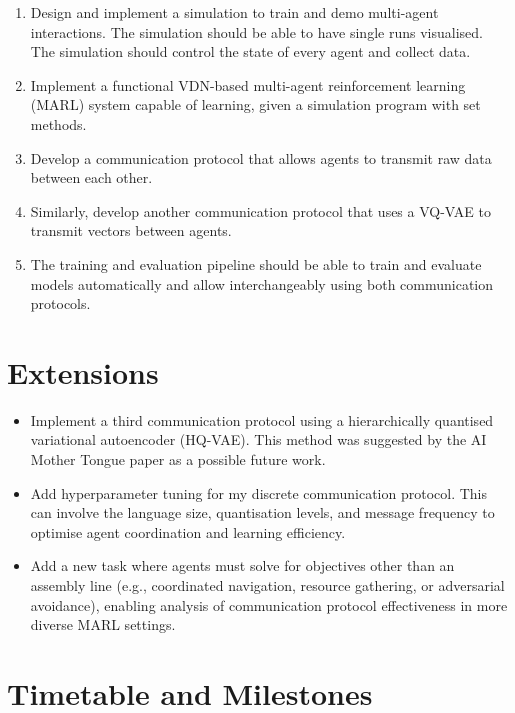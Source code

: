 \begin{enumerate}
\item Design and implement a simulation to train and demo multi-agent interactions. The simulation should be able to have single runs visualised. The simulation should control the state of every agent and collect data.
\item Implement a functional VDN-based multi-agent reinforcement learning (MARL) system capable of learning, given a simulation program with set methods.
\item Develop a communication protocol that allows agents to transmit raw data between each other.
\item Similarly, develop another communication protocol that uses a VQ-VAE  to transmit vectors between agents.
\item The training and evaluation pipeline should be able to train and evaluate models automatically and allow interchangeably using both communication protocols.
\end{enumerate}


\section{Extensions}

\begin{itemize}
\item Implement a third communication protocol using a hierarchically quantised variational autoencoder (HQ-VAE). This method was suggested by the AI Mother Tongue paper as a possible future work.
\item Add hyperparameter tuning for my discrete communication protocol. This can involve the language size, quantisation levels, and message frequency to optimise agent coordination and learning efficiency.
\item Add a new task where agents must solve for objectives other than an assembly line (e.g., coordinated navigation, resource gathering, or adversarial avoidance), enabling analysis of communication protocol effectiveness in more diverse MARL settings.
\end{itemize}

\pagebreak

\section{Timetable and Milestones}

